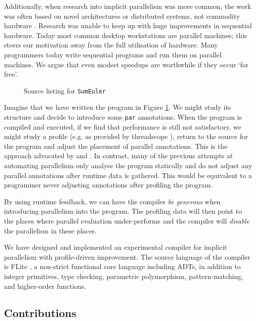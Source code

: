 Additionally, when research into implicit parallelism was more common, the work
was often based on novel architectures or distributed systems, not commodity
hardware \citep{GRIP, hammond2000research}. Research was unable to keep
up with huge improvements in sequential hardware. Today most common desktop
workstations are parallel machines; this steers
our motivation away from the full utilisation of hardware. Many programmers
today write sequential programs and run them on parallel machines. We
argue that even modest speedups are worthwhile if they occur `for free'.

\begin{figure}
  
\caption{Source listing for \texttt{SumEuler}}
\label{sumOrig}
\end{figure}

Imagine that we have written the program in Figure \ref{sumOrig}. We might
study its structure and decide to introduce some \verb-par- annotations.  When
the program is compiled and executed, if we find that performance is still not
satisfactory, we might study a profile (e.g. as provided by threadscope
\citep{Jones2009Tuning}), return to the source for the program and adjust the
placement of parallel annotations. This is the approach advocated by
\citep{Jones2009Tuning} and \citep{runciman1994profiling}.  In contrast, many of
the previous attempts at automating parallelism only analyse the program
statically and do not adjust any parallel annotations after runtime data is
gathered. This would be equivalent to a programmer never adjusting annotations
after profiling the program.

By using runtime feedback, we can have the compiler \emph{be generous} when
introducing parallelism into the program. The profiling data will then point to
the places where parallel evaluation under-performs and the compiler will
\emph{disable} the parallelism in these places. 


We have designed and implemented an experimental compiler for implicit
parallelism with profile-driven improvement. The source language of the
compiler is FLite \citep{naylor2010reduceron}, a non-strict functional core
language including ADTs, in addition to integer primitives, type checking,
parametric polymorphism, pattern-matching, and higher-order functions. 

\subsection{Contributions}

